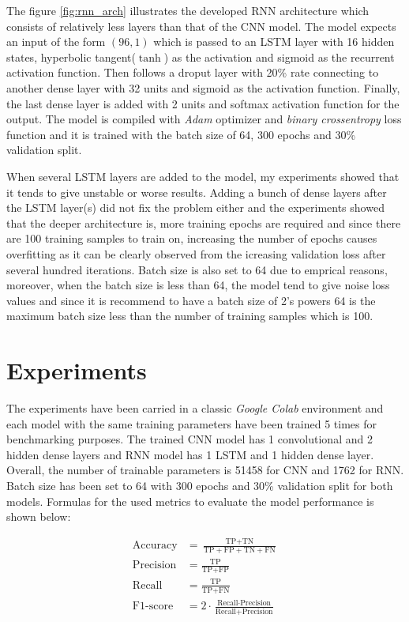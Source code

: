 \documentclass[a4paper]{article}
\begin{document}
The figure \ref{fig:rnn_arch} illustrates the developed RNN architecture which consists of relatively less layers than that of the CNN model. The model expects an input of the form $(96, 1)$ which is 
passed to an LSTM layer with 16 hidden states, hyperbolic tangent($\tanh$) as the activation and sigmoid as the recurrent activation function. Then follows a droput layer with 20\% rate connecting to 
another dense layer with 32 units and sigmoid as the activation function. Finally, the last dense layer is added with 2 units and softmax activation function for the output. The model is compiled with 
\textit{Adam} optimizer and \textit{binary crossentropy} loss function and it is trained with the batch size of 64, 300 epochs and 30\% validation split.

When several LSTM layers are added to the model, my experiments showed that it tends to give unstable or worse results. Adding a bunch of dense layers after the LSTM layer(s) did not fix the problem 
either and the experiments showed that the deeper architecture is, more training epochs are required and since there are 100 training samples to train on, increasing the number of epochs causes overfitting 
as it can be clearly observed from the icreasing validation loss after several hundred iterations. Batch size is also set to 64 due to emprical reasons, moreover, when the batch size is less than 64, 
the model tend to give noise loss values and since it is recommend to have a batch size of 2's powers 64 is the maximum batch size less than the number of training samples which is 100.

\section{Experiments}
The experiments have been carried in a classic \textit{Google Colab} environment and each model with the same training parameters have been trained 5 times for benchmarking purposes. The trained CNN model 
has 1 convolutional and 2 hidden dense layers and RNN model has 1 LSTM and 1 hidden dense layer. Overall, the number of trainable parameters is 51458 for CNN and 1762 for RNN. Batch size has been set to 
64 with 300 epochs and 30\% validation split for both models. Formulas for the used metrics to evaluate the model performance is shown below:

\begin{align*}
	\text{Accuracy} &= \frac{\text{TP}+\text{TN}}{\text{TP}+\text{FP}+\text{TN}+\text{FN}} \\
	\text{Precision} &= \frac{\text{TP}}{\text{TP}+\text{FP}} \\
	\text{Recall} &= \frac{\text{TP}}{\text{TP}+\text{FN}} \\
	\text{F1-score} &= 2\cdot\frac{\text{Recall}\cdot\text{Precision}}{\text{Recall}+\text{Precision}}
\end{align*}
\end{document}
